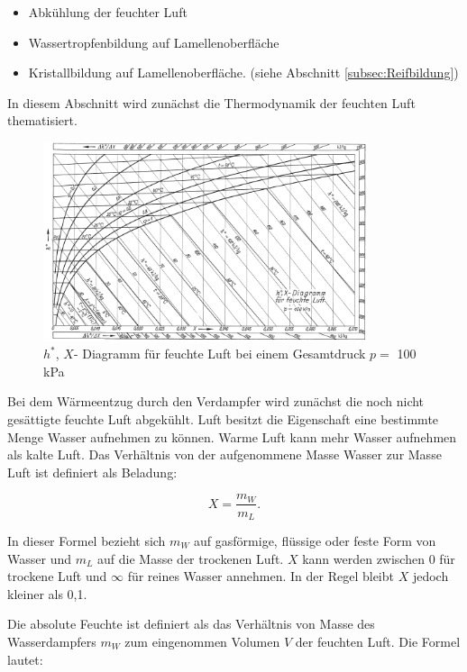 \begin{itemize}
\item	Abkühlung der feuchter Luft 
\item 	Wassertropfenbildung auf Lamellenoberfläche
\item	Kristallbildung auf Lamellenoberfläche. (siehe Abschnitt \ref{subsec:Reifbildung})
\end{itemize}

In diesem Abschnitt  wird zunächst die Thermodynamik der feuchten Luft thematisiert. 


\begin{figure}[htb]
\centering		\includegraphics[width=0.85\textwidth]{Pictures/h_x_Diagramm_Beahr.png}
\caption{$h^*$, $X$- Diagramm für feuchte Luft bei einem Gesamtdruck $p= $ 100 kPa \citep{Baehr2013}}
\label{fig:h_x_diagramm}
\end{figure}


Bei dem Wärmeentzug durch den Verdampfer wird  zunächst die noch nicht gesättigte feuchte Luft abgekühlt. Luft besitzt die Eigenschaft eine bestimmte Menge Wasser aufnehmen zu können. Warme Luft kann mehr Wasser aufnehmen als kalte Luft. Das Verhältnis von der aufgenommene Masse Wasser zur Masse Luft ist definiert als Beladung: 

\begin{equation}
X = \frac{m_W}{m_L}.
\label{eq:Beladung}
\end{equation}

In dieser Formel bezieht sich $m_W$ auf gasförmige, flüssige oder feste Form von Wasser und $m_L$ auf die Masse der trockenen Luft.  $X$ kann werden zwischen 0 für trockene Luft und $\infty$ für reines Wasser annehmen. In der Regel bleibt $X$ jedoch kleiner als 0,1. 

Die absolute Feuchte ist definiert als das Verhältnis von Masse des Wasserdampfers $m_W$ zum eingenommen Volumen $V$ der feuchten Luft. Die Formel lautet: 

